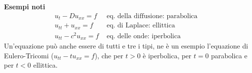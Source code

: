{\bf Esempi noti}
\[
\begin{array}{ll}
	u_t - Du_{xx}=f &\mbox{ eq. della diffusione: parabolica }\\
	u_{tt} + u_{xx}=f &\mbox{ eq. di Laplace: ellittica }\\
	u_{tt} - c^2 u_{xx}=f &\mbox{ eq. delle onde: iperbolica }
\end{array}
\]
Un'equazione pu\`o anche essere di tutti e tre i tipi, ne \`e un esempio
l'equazione di Eulero-Tricomi ($u_{tt}-tu_{xx}=f$), che per $t>0$ \`e
iperbolica,
per $t=0$ parabolica e per $t<0$ ellittica.
